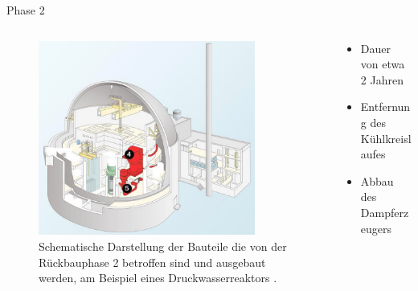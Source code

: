 \begin{frame}{Phase 2}
  \begin{columns}

    \begin{column}{0.48\textwidth}
      \begin{figure}
         \centering
         \includegraphics[width=0.85\textwidth]{./bilder/abbau_phase_2_spiegel.png}
         \caption{ Schematische Darstellung der Bauteile die von der Rückbauphase 2 betroffen sind und ausgebaut werden, am Beispiel eines Druckwasserreaktors \cite{abbau_grafik_stade}. }
         \label{ fig: phase_2 }
       \end{figure}
     \end{column}

     \begin{column}{0.48\textwidth}
       \begin{itemize}
         \setlength\itemsep{1.2em}
        \item{ Dauer von etwa 2 Jahren}
         \item{ Entfernung des Kühlkreislaufes }
         \item{ Abbau des Dampferzeugers}
       \end{itemize}
     \end{column}

  \end{columns}
\end{frame}




